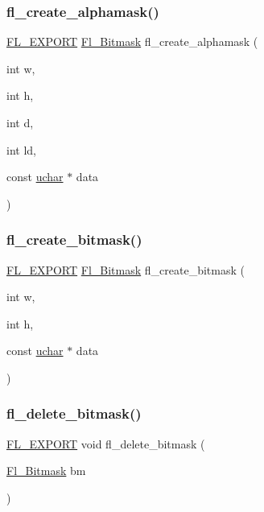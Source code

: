 \subsubsection{\texorpdfstring{fl\+\_\+create\+\_\+alphamask()}{fl\_create\_alphamask()}}
{\footnotesize\ttfamily \hyperlink{_fl___export_8_h_aa9ba29a18aee9d738370a06eeb4470fc}{F\+L\+\_\+\+E\+X\+P\+O\+RT} \hyperlink{mac_8_h_a90133b6f8cfb11ab81d83b2c4d91310d}{Fl\+\_\+\+Bitmask} fl\+\_\+create\+\_\+alphamask (\begin{DoxyParamCaption}\item[{int}]{w,  }\item[{int}]{h,  }\item[{int}]{d,  }\item[{int}]{ld,  }\item[{const \hyperlink{fl__types_8h_a65f85814a8290f9797005d3b28e7e5fc}{uchar} $\ast$}]{data }\end{DoxyParamCaption})}

\mbox{\label{x_8_h_a5197adda8c1f9ea113311449789720e9}} 
\subsubsection{\texorpdfstring{fl\+\_\+create\+\_\+bitmask()}{fl\_create\_bitmask()}}
{\footnotesize\ttfamily \hyperlink{_fl___export_8_h_aa9ba29a18aee9d738370a06eeb4470fc}{F\+L\+\_\+\+E\+X\+P\+O\+RT} \hyperlink{mac_8_h_a90133b6f8cfb11ab81d83b2c4d91310d}{Fl\+\_\+\+Bitmask} fl\+\_\+create\+\_\+bitmask (\begin{DoxyParamCaption}\item[{int}]{w,  }\item[{int}]{h,  }\item[{const \hyperlink{fl__types_8h_a65f85814a8290f9797005d3b28e7e5fc}{uchar} $\ast$}]{data }\end{DoxyParamCaption})}

\mbox{\label{x_8_h_a79b34dfedfba622e0626dd5832ca71f2}} 
\subsubsection{\texorpdfstring{fl\+\_\+delete\+\_\+bitmask()}{fl\_delete\_bitmask()}}
{\footnotesize\ttfamily \hyperlink{_fl___export_8_h_aa9ba29a18aee9d738370a06eeb4470fc}{F\+L\+\_\+\+E\+X\+P\+O\+RT} void fl\+\_\+delete\+\_\+bitmask (\begin{DoxyParamCaption}\item[{\hyperlink{mac_8_h_a90133b6f8cfb11ab81d83b2c4d91310d}{Fl\+\_\+\+Bitmask}}]{bm }\end{DoxyParamCaption})}

